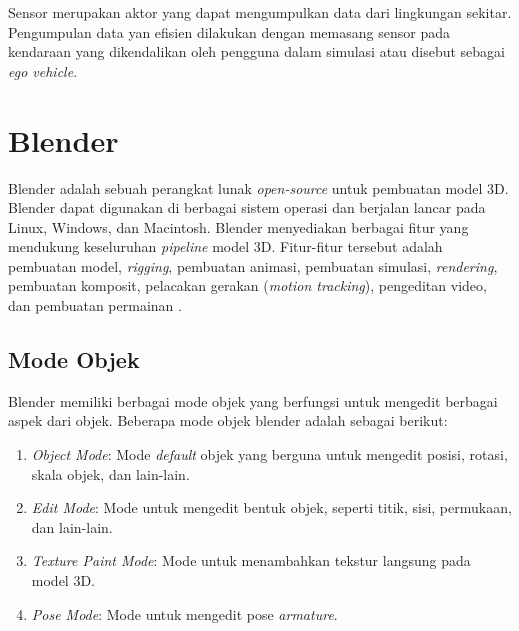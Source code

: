 
Sensor merupakan aktor yang dapat mengumpulkan data dari lingkungan sekitar.
Pengumpulan data yan efisien dilakukan dengan memasang sensor pada kendaraan
yang dikendalikan oleh pengguna dalam simulasi atau disebut sebagai \textit{ego
vehicle}.


\section{Blender \parencite{blender-manual}}

Blender adalah sebuah perangkat lunak \textit{open-source} untuk pembuatan model
3D. Blender dapat digunakan di berbagai sistem operasi dan berjalan lancar pada
Linux, Windows, dan Macintosh. Blender menyediakan berbagai fitur yang mendukung
keseluruhan \textit{pipeline} model 3D. Fitur-fitur tersebut adalah pembuatan
model, \textit{rigging}, pembuatan animasi, pembuatan simulasi,
\textit{rendering}, pembuatan komposit, pelacakan gerakan (\textit{motion
tracking}), pengeditan video, dan pembuatan permainan \parencite{blender-about}.

\subsection{Mode Objek}

Blender memiliki berbagai mode objek yang berfungsi untuk mengedit berbagai
aspek dari objek. Beberapa mode objek blender adalah sebagai berikut:

\begin{enumerate}

    \item \textit{Object Mode}: Mode \textit{default} objek yang berguna untuk
    mengedit posisi, rotasi, skala objek, dan lain-lain.

    \item \textit{Edit Mode}: Mode untuk mengedit bentuk objek, seperti titik,
    sisi, permukaan, dan lain-lain.

    \item \textit{Texture Paint Mode}: Mode untuk menambahkan tekstur langsung
    pada model 3D.

    \item \textit{Pose Mode}: Mode untuk mengedit pose \textit{armature}.

\end{enumerate}

